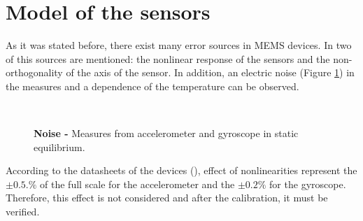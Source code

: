 \documentclass[conference]{IEEEtran}
\begin{document}
\section{Model of the sensors}
\label{sec:modelo}

As it was stated before, there exist many error sources in MEMS devices. In \cite{bib:calib_imu} two of this sources are mentioned: the nonlinear response of the sensors and the non-orthogonality of the axis of the sensor. In addition, an electric noise (Figure \ref{fig:noise}) in the measures and a dependence of the temperature can be observed.\\
\vspace{-10pt}
\begin{figure}[h!]
  \centering
  \\[-5pt]
  			\vspace{-5pt}
  \caption{\textbf{Noise -} Measures from accelerometer and gyroscope in static equilibrium.}
  \label{fig:noise}
\end{figure}

According to the datasheets of the devices (\cite{bib:acc_data, bib:gyro_data}), effect of nonlinearities represent the $\pm 0.5.\%$  of the full scale for the accelerometer and the $\pm 0.2\%$ for the gyroscope. Therefore, this effect is not considered and after the calibration, it must be verified.\\
\end{document}
